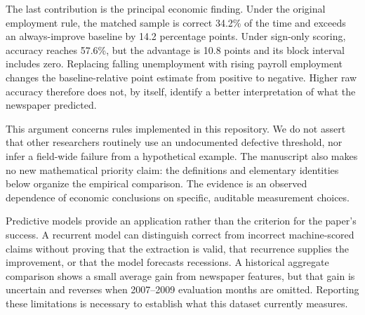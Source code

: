The last contribution is the principal economic finding. Under the original employment rule, the matched sample is correct 34.2\% of the time and exceeds an always-improve baseline by 14.2 percentage points. Under sign-only scoring, accuracy reaches 57.6\%, but the advantage is 10.8 points and its block interval includes zero. Replacing falling unemployment with rising payroll employment changes the baseline-relative point estimate from positive to negative. Higher raw accuracy therefore does not, by itself, identify a better interpretation of what the newspaper predicted.

This argument concerns rules implemented in this repository. We do not assert that other researchers routinely use an undocumented defective threshold, nor infer a field-wide failure from a hypothetical example. The manuscript also makes no new mathematical priority claim: the definitions and elementary identities below organize the empirical comparison. The evidence is an observed dependence of economic conclusions on specific, auditable measurement choices.

Predictive models provide an application rather than the criterion for the paper's success. A recurrent model can distinguish correct from incorrect machine-scored claims without proving that the extraction is valid, that recurrence supplies the improvement, or that the model forecasts recessions. A historical aggregate comparison shows a small average gain from newspaper features, but that gain is uncertain and reverses when 2007--2009 evaluation months are omitted. Reporting these limitations is necessary to establish what this dataset currently measures.

